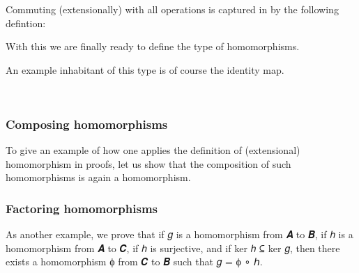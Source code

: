 \documentclass[a4paper,USenglish,cleveref,autoref,thm-restate]{lipics-v2019}
\begin{document}
Commuting (extensionally) with all operations is captured in \agda by the following defintion:
\begin{code}\end{code}
With this we are finally ready to define the type of homomorphisms.
\begin{code}\end{code}
An example inhabitant of this type is of course the identity map.
\begin{code}
\>[0]\AgdaSpace{}%
\AgdaSymbol{:}%
\>[6]\AgdaSymbol{(}\AgdaSpace{}%
\AgdaSymbol{:}\AgdaSpace{}%
\AgdaSpace{}%
\AgdaSpace{}%
\AgdaSymbol{)}\AgdaSpace{}%
\AgdaSpace{}%
\AgdaSpace{}%
\AgdaSpace{}%
\<%
\\
\>[0]\AgdaSpace{}%
\AgdaSymbol{\AgdaUnderscore{}}\AgdaSpace{}%
\AgdaSymbol{=}\AgdaSpace{}%
\AgdaSpace{}%
\AgdaSpace{}%
\AgdaSpace{}%
\AgdaSymbol{)}\AgdaSpace{}%
\AgdaOperator{\AgdaInductiveConstructor{,}}\AgdaSpace{}%
\AgdaSpace{}%
\AgdaBound{\AgdaUnderscore{}}\AgdaSpace{}%
\AgdaBound{\AgdaUnderscore{}}\AgdaSpace{}%
\AgdaSpace{}%
\<%
\end{code}
\subsubsection{Composing homomorphisms}
To give an example of how one applies the definition of (extensional) homomorphism in proofs, let us show that the composition of such homomorphisms is again a homomorphism.
\begin{code}\end{code}

\subsubsection{Factoring homomorphisms}
As another example, we prove that if 𝑔 is a homomorphism from 𝑨 to 𝑩, if ℎ is a homomorphism from 𝑨 to 𝑪, if ℎ is surjective, and if ker ℎ ⊆ ker 𝑔, then there exists a homomorphism ϕ from 𝑪 to 𝑩 such that 𝑔 = ϕ ∘ ℎ.
\begin{code}\end{code}
\end{document}
